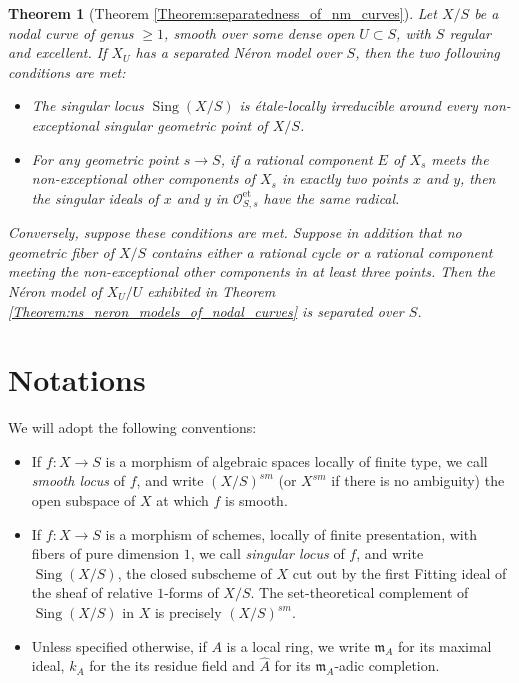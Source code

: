 \documentclass[a4paper,12pt]{amsart} %
\numberwithin{equation}{subsection}
\newcommand{\on}[1]{\operatorname{#1}}
\def\Sing{\operatorname{Sing}}
\theoremstyle{definition}
\theoremstyle{plain}%
\newtheorem{theorem}[definition]{Theorem}
\theoremstyle{remark}
\renewcommand{\O}{\mathcal{O}}
\begin{document}
\begin{theorem}[Theorem \ref{Theorem:separatedness_of_nm_curves}]
Let $X/S$ be a nodal curve of genus $\geq 1$, smooth over some dense open $U\subset S$, with $S$ regular and excellent. If $X_U$ has a separated N\'eron model over $S$, then the two following conditions are met:
\begin{itemize}
\item The singular locus $\Sing(X/S)$ is étale-locally irreducible around every non-exceptional singular geometric point of $X/S$.
\item For any geometric point $s\to S$, if a rational component $E$ of $X_s$ meets the non-exceptional other components of $X_s$ in exactly two points $x$ and $y$, then the singular ideals of $x$ and $y$ in $\O_{S,s}^{\on{et}}$ have the same radical.
\end{itemize}

Conversely, suppose these conditions are met. Suppose in addition that no geometric fiber of $X/S$ contains either a rational cycle or a rational component meeting the non-exceptional other components in at least three points. Then the N\'eron model of $X_U/U$ exhibited in Theorem \ref{Theorem:ns_neron_models_of_nodal_curves} is separated over $S$.
\end{theorem}

\section*{Notations}

We will adopt the following conventions:
\begin{itemize}
\item If $f \colon X \to S$ is a morphism of algebraic spaces locally of finite type, we call \emph{smooth locus} of $f$, and write $(X/S)^{sm}$ (or $X^{sm}$ if there is no ambiguity) the open subspace of $X$ at which $f$ is smooth.
\item If $f \colon X \to S$ is a morphism of schemes, locally of finite presentation, with fibers of pure dimension $1$, we call \emph{singular locus} of $f$, and write $\Sing(X/S)$, the closed subscheme of $X$ cut out by the first Fitting ideal of the sheaf of relative $1$-forms of $X/S$. The set-theoretical complement of $\Sing(X/S)$ in $X$ is precisely $(X/S)^{sm}$.
\item Unless specified otherwise, if $A$ is a local ring, we write $\mathfrak{m}_A$ for its maximal ideal, $k_A$ for the its residue field and $\widehat{A}$ for its $\mathfrak{m}_A$-adic completion.
\end{itemize}
\end{document}
